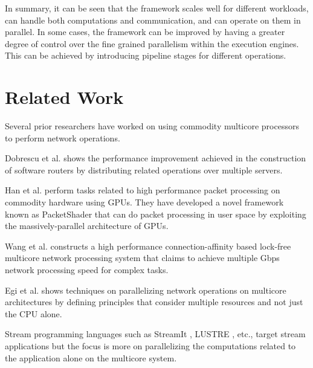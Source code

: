 \documentclass[conference]{IEEEtran}
\newcommand{\comment}[1]{}
\begin{document}
In summary, it can be seen that the framework scales well for different workloads, can handle both computations and communication, and can operate on them in parallel. In some cases, the framework can be improved by having a greater degree of control over the fine grained parallelism within the execution engines. This can be achieved by introducing pipeline stages for different operations.

\section{Related Work}

Several prior researchers \cite{Dobrescu09routebricks:exploiting}\cite{Han:2010:PGS:1851275.1851207}\cite{Wang:2009:PPN:1542275.1542307}\cite{springerlink:10.1007/s11227-011-0579-3} have worked on using commodity multicore processors to perform network operations.

Dobrescu et al.\cite{Dobrescu09routebricks:exploiting} shows the performance improvement achieved in the construction of software routers by distributing related operations over multiple servers.

Han et al. \cite{Han:2010:PGS:1851275.1851207} perform tasks related to high performance packet processing on commodity hardware using GPUs. They have developed a novel framework known as PacketShader that can do packet processing in user space by exploiting the massively-parallel architecture of GPUs.

Wang et al. \cite{Wang:2009:PPN:1542275.1542307} constructs a high performance connection-affinity based lock-free multicore network processing system that claims to achieve multiple Gbps network processing speed for complex tasks.

Egi et al.\cite{springerlink:10.1007/s11227-011-0579-3} shows techniques on parallelizing network operations on multicore architectures by defining principles that consider multiple resources and not just the CPU alone.

Stream programming languages such as StreamIt \cite{Thies:2002:SLS:647478.727935}, LUSTRE \cite{Halbwachs91thesynchronous}, etc., target stream applications but the focus is more on parallelizing the computations related to the application alone on the multicore system.

\comment{
All of these applications are more focused on operating as a network application and primarily focus on parallelizing packet operations. In our work even though a part of it involves parallelizing network operations, the objective of this research is to provide support for parallelizing stream application and distributing their workloads over multiple systems. This also requires optimizing the underlying network operations by parallelizing it.}
\end{document}
